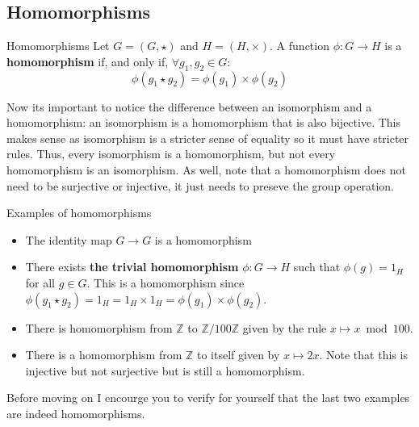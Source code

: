 \subsection{Homomorphisms}
\begin{definition}{Homomorphisms}{}
    Let $G = (G, \star)$ and $H = (H, \times)$. A function $\phi: G \to H$ is a \textbf{homomorphism} if, and only if, $\forall g_1, g_2\in G$:
    \begin{equation*}
        \phi(g_1 \star g_2) = \phi(g_1) \times \phi(g_2)
    \end{equation*}
\end{definition}

Now its important to notice the difference between an isomorphism and a homomorphism: an isomorphism is a homomorphism that is also bijective. This makes sense as isomorphism is a stricter sense of equality so it must have stricter rules. Thus, every isomorphism is a homomorphism, but not every homomorphism is an isomorphism. As well, note that a homomorphism does not need to be surjective or injective, it just needs to preseve the group operation. 

\begin{example}{Examples of homomorphisms}{}
    \begin{itemize}
        \item The identity map $G \to G$ is a homomorphism
        \item There exists \textbf{the trivial homomorphism} $\phi: G \to H$ such that $\phi(g) = 1_H$ for all $g \in G$. This is a homomorphism since $\phi(g_1 \star g_2) = 1_H = 1_H \times 1_H = \phi(g_1) \times \phi(g_2)$.
        \item There is homomorphism from $\mathbb{Z}$ to $\mathbb{Z}/100\mathbb{Z}$ given by the rule $x \mapsto x \bmod 100$.
        \item There is a homomorphism from $\mathbb{Z}$ to itself given by $x \mapsto 2x$. Note that this is injective but not surjective but is still a homomorphism.
    \end{itemize}
\end{example}
Before moving on I encourge you to verify for yourself that the last two examples are indeed homomorphisms.

